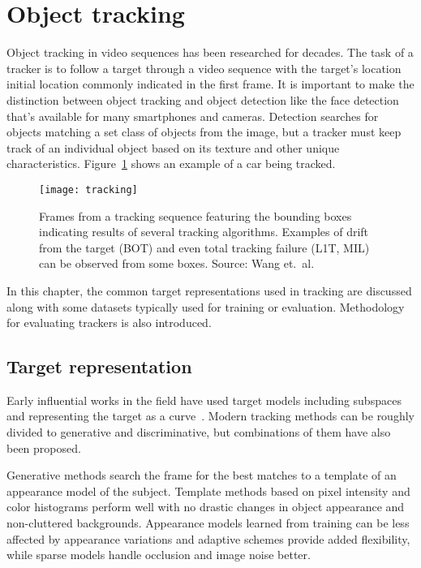 \section{Object tracking}
Object tracking in video sequences has been researched for decades. The task of a
tracker is to follow a target through a video sequence with the target's location
initial location commonly indicated in the first frame. It is important to make the
distinction between object tracking and object detection like the face detection that's
available for many smartphones and cameras. Detection searches for objects matching
a set class of objects from the image, but a tracker must keep track of an individual
object based on its texture and other unique characteristics. Figure~\ref{fig:tracking}
shows an example of a car being tracked.

\begin{figure}[H]
\centering
\texttt{[image: tracking]}
\caption{Frames from a tracking sequence featuring the bounding boxes indicating results
         of several tracking algorithms. Examples of drift from the target (BOT) and even
         total tracking failure (L1T, MIL) can be observed from some boxes. Source: Wang
         et.~al.~\cite{OBJECT_PLS}}\label{fig:tracking}
\end{figure}

In this chapter, the common target representations used in tracking are discussed
along with some datasets typically used for training or evaluation. Methodology for
evaluating trackers is also introduced.

\subsection{Target representation}
Early influential works in the field have used target models including subspaces
~\cite{EIGENTRACK} and representing the target as a curve~\cite{CONDENSATION}. Modern
tracking methods can be roughly divided to generative and discriminative, but combinations
of them have also been proposed.~\cite{DLT}

Generative methods search the frame for the best matches to a template of an appearance
model of the subject. Template methods based on pixel intensity and color histograms
perform well with no drastic changes in object appearance and non-cluttered backgrounds.
Appearance models learned from training can be less affected by appearance variations
and adaptive schemes provide added flexibility, while sparse models handle occlusion
and image noise better.~\cite{OBJECT_PLS}

